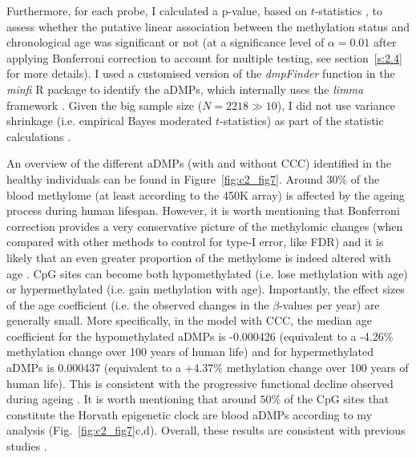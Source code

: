 Furthermore, for each probe, I calculated a p-value, based on $t$-statistics \cite{Teschendorff2018}, to assess whether the putative linear association between the methylation status and chronological age was significant or not (at a significance level of $\alpha=0.01$ after applying Bonferroni correction to account for multiple testing, see section~\ref{s:2.4} for more details). I used a customised version of the \textit{dmpFinder} function in the \textit{minfi} R package \cite{Aryee2014} to identify the aDMPs, which internally uses the \textit{limma} framework \cite{Ritchie2015}. Given the big sample size ($N = 2218 \gg 10$), I did not use variance shrinkage (i.e. empirical Bayes moderated $t$-statistics) as part of the statistic calculations \cite{Ritchie2015}.  

\bigskip

An overview of the different aDMPs (with and without CCC) identified in the healthy individuals can be found in Figure~\ref{fig:c2_fig7}. Around $30\%$ of the blood methylome (at least according to the 450K array) is affected by the ageing process during human lifespan. However, it is worth mentioning that Bonferroni correction provides a very conservative picture of the methylomic changes (when compared with other methods to control for type-I error, like \acrshort{FDR}) and it is likely that an even greater proportion of the methylome is indeed altered with age \cite{Zhu2018}. CpG sites can become both hypomethylated (i.e. lose methylation with age) or hypermethylated (i.e. gain methylation with age). Importantly, the effect sizes of the age coefficient (i.e. the observed changes in the $\beta$-values per year) are generally small. More specifically, in the model with CCC, the median age coefficient for the hypomethylated aDMPs is -0.000426 (equivalent to a -4.26\% methylation change over 100 years of human life) and for hypermethylated aDMPs is 0.000437 (equivalent to a +4.37\% methylation change over 100 years of human life). This is consistent with the progressive functional decline observed during ageing \cite{Lopez-Otin2013}. It is worth mentioning that around $50\%$ of the CpG sites that constitute the Horvath epigenetic clock are blood aDMPs according to my analysis (Fig.~\ref{fig:c2_fig7}c,d). Overall, these results are consistent with previous studies \cite{Slieker2016,Slieker2018,Zhu2018,VanDongen2016}. 

